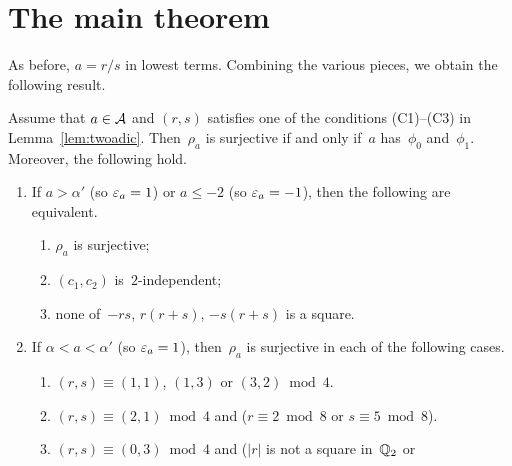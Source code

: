\section{The main theorem}
\paperitems

As before, $a = r/s$ in lowest terms. Combining the various pieces, we obtain the following
result.

\begin{theorem}
  \label{thm:main}
  \leanok
  Assume that $a \in \mathcal{A}$ and $(r, s)$ satisfies one of the conditions (C1)--(C3) in
  Lemma~\ref{lem:twoadic}. Then~$\rho_a$ is surjective if and only if~$a$ has~$\phi_0$
  and~$\phi_1$. Moreover, the following hold.
  \begin{enumerate}
    \item If $a > \alpha'$ (so $\varepsilon_a = 1$) or $a \le -2$ (so $\varepsilon_a = -1$), then the following
          are equivalent.
          \begin{enumerate}
            \item[(i)] $\rho_a$ is surjective;
            \item[(ii)] $(c_1, c_2)$ is~$2$-independent;
            \item[(iii)] none of~$-rs$, $r(r+s)$, $-s(r+s)$ is a square.
          \end{enumerate}
    \item If $\alpha < a < \alpha'$ (so $\varepsilon_a = 1$), then~$\rho_a$ is surjective in each of the
          following cases.
          \begin{enumerate}
            \item[(a)] $(r, s) \equiv (1, 1)$, $(1, 3)$ or $(3, 2) \bmod 4$.
            \item[(b)] $(r, s) \equiv (2, 1) \bmod 4$ and ($r \equiv 2 \bmod 8$ or
                  $s \equiv 5 \bmod 8$).
            \item[(c)] $(r, s) \equiv (0, 3) \bmod 4$ and ($|r|$ is not a square in~$\mathbb{Q}_2$ or

\end{enumerate}
\end{enumerate}
\end{theorem}
